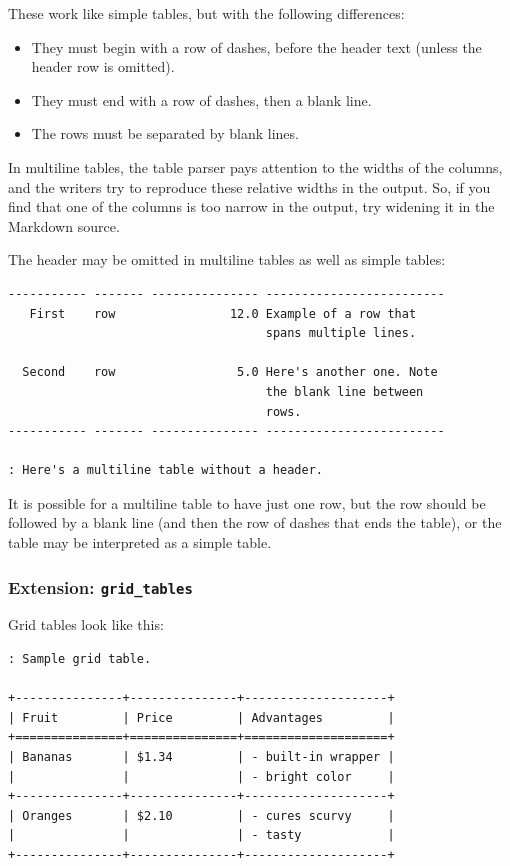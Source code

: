 \documentclass[
]{article}
\providecommand{\tightlist}{%
  \setlength{\itemsep}{0pt}\setlength{\parskip}{0pt}}
\begin{document}
These work like simple tables, but with the following differences:

\begin{itemize}
\tightlist
\item
  They must begin with a row of dashes, before the header text (unless
  the header row is omitted).
\item
  They must end with a row of dashes, then a blank line.
\item
  The rows must be separated by blank lines.
\end{itemize}

In multiline tables, the table parser pays attention to the widths of
the columns, and the writers try to reproduce these relative widths in
the output. So, if you find that one of the columns is too narrow in the
output, try widening it in the Markdown source.

The header may be omitted in multiline tables as well as simple tables:

\begin{verbatim}
----------- ------- --------------- -------------------------
   First    row                12.0 Example of a row that
                                    spans multiple lines.

  Second    row                 5.0 Here's another one. Note
                                    the blank line between
                                    rows.
----------- ------- --------------- -------------------------

: Here's a multiline table without a header.
\end{verbatim}

It is possible for a multiline table to have just one row, but the row
should be followed by a blank line (and then the row of dashes that ends
the table), or the table may be interpreted as a simple table.

\hypertarget{extension-grid_tables}{%
\subsubsection{\texorpdfstring{Extension:
\texttt{grid\_tables}}{Extension: grid\_tables}}\label{extension-grid_tables}}

Grid tables look like this:

\begin{verbatim}
: Sample grid table.

+---------------+---------------+--------------------+
| Fruit         | Price         | Advantages         |
+===============+===============+====================+
| Bananas       | $1.34         | - built-in wrapper |
|               |               | - bright color     |
+---------------+---------------+--------------------+
| Oranges       | $2.10         | - cures scurvy     |
|               |               | - tasty            |
+---------------+---------------+--------------------+
\end{verbatim}
\end{document}
